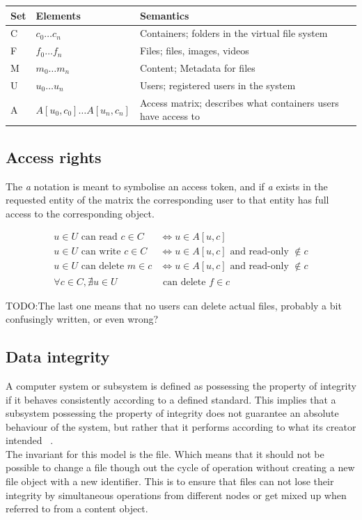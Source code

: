 \documentclass[a4paper,12pt]{article}
\newcommand{\Iff}{\Leftrightarrow}
\newcommand{\fix}{\colorbox{yellow!30}{TODO:}}
\begin{document}
\begin{center}
    \begin{tabular}{ | l | l | l | p{5cm} |}
        \hline
        \textbf{Set} & \textbf{Elements} & \textbf{Semantics} \\ \hline
        C   & $c_0\dots c_n$                & Containers; folders in the virtual file system\\ \hline
        F   & $f_0\dots f_n$                & Files; files, images, videos\\ \hline
        M   & $m_0\dots m_n$                & Content; Metadata for files\\ \hline
        U   & $u_0\dots u_n$                & Users; registered users in the system\\ \hline
        A   & $A[u_0,c_0]\dots A[u_n, c_n]$ & Access matrix; describes what containers users have access to\\ \hline
    \end{tabular}
\end{center}


\subsection{Access rights}
The \textit{a} notation is meant to symbolise an access token, and if \textit{a} exists in the
requested entity of the matrix the corresponding user to that entity has full access to the
corresponding object.

\begin{equation}
    \begin{split}
        u \in U \text{ can read } c \in C & \Iff u \in A[u,c] \\
        u \in U \text{ can write } c \in C & \Iff u \in A[u,c] \text{ and read-only } \notin c \\
        u \in U \text{ can delete } m \in c & \Iff u \in A[u,c] \text{ and read-only } \notin c \\
        \forall c \in C, \nexists u \in U & \text{ can delete } f \in c
    \end{split}
\end{equation}

\fix The last one means that no users can delete actual files, probably a bit confusingly written, 
or even wrong?

\subsection{Data integrity}
A computer system or subsystem is defined as possessing the property of integrity if it behaves consistently
according to a defined standard. This implies that a subsystem possessing the property of integrity
does not guarantee an absolute behaviour of the system, but rather that it performs according to
what its creator intended ~\cite{BIBA}.
\\
The invariant for this model is the file. Which means that it should not be possible to
change a file though out the cycle of operation without creating a new file object with a new
identifier. This is to ensure that files can not lose their integrity by simultaneous
operations from different nodes or get mixed up when referred to from a content object. 
\end{document}
